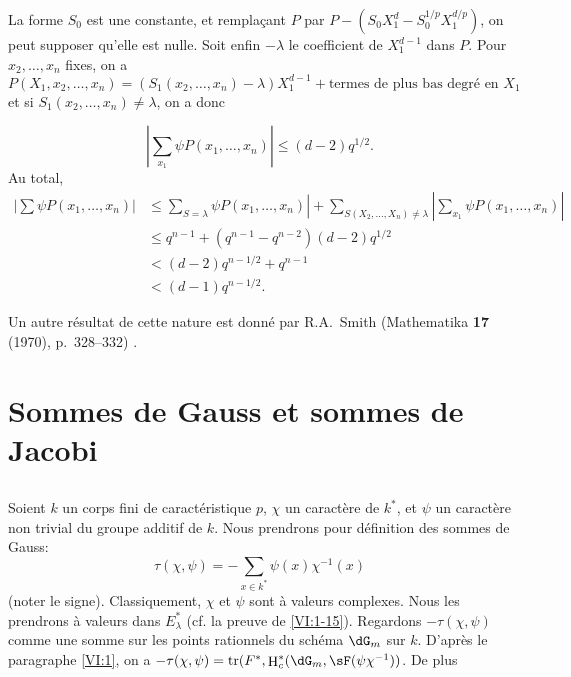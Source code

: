 \documentclass[oneside]{book}
\DeclareMathOperator{\h}{H}
\DeclareMathOperator{\tr}{tr}
\theoremstyle{sga-source}
\theoremstyle{sga-source-dash}
\theoremstyle{sga-source-dotdash}
\theoremstyle{sga-source-number-note-dash}
\theoremstyle{sga-source-note-number-dotdash}
\theoremstyle{sga-source-example-dotdash}
\theoremstyle{sga-source-inline-number}
\theoremstyle{sga-source-bare-number}
\theoremstyle{sga-source}
\newcommand{\PrintPage}[1]{}\newcommand{\MathPage}[1]{}\newcommand{\PrintCite}[2]{#1}\newcommand{\var}[3]{#1}
\begin{document}
La forme $S_0$ est une constante, et remplaçant $P$ par 
$P-(S_0 X_1^d -S_0^{1/p} X_1^{d/p})$, on peut supposer qu'elle est nulle. Soit 
enfin $-\lambda$ le coefficient de $X_1^{d-1}$ dans $P$. Pour $x_2,\dots,x_n$ 
fixes, on a 
\[
  P(X_1,x_2,\dots,x_n) = (S_1(x_2,\dots,x_n)-\lambda) X_1^{d-1} + \text{termes de plus bas degré en $X_1$} 
\]
et si $S_1(x_2,\dots,x_n)\ne \lambda$, on a donc 
\PrintPage{195}
\[
  \left| \sum_{x_1} \psi P(x_1,\dots,x_n)\right| \leqslant (d-2) q^{1/2} \text{.} 
\]
Au total, 
\begin{align*}
  \left|\sum \psi P(x_1,\dots,x_n)\right| 
    &\leqslant \var{\left.}{\left|}{S45-SOL-0794}\var{\sum_{S=\lambda}}{\sum_{S_1=\lambda}}{S45-SOL-0795} \psi P(x_1,\dots,x_n)\right| + \var{\sum_{S(X_2,\dots,X_n)\ne\lambda}}{\sum_{S_1(X_2,\dots,X_n)\ne\lambda}}{S45-SOL-0796} \left| \sum_{x_1} \psi P(x_1,\dots,x_n)\right| \\
    &\leqslant q^{n-1} + (q^{n-1}-q^{n-2})(d-2) q^{1/2} \\
    &\var{< (d-2) q^{n-1/2} + q^{n-1}}{\leqslant (d-2) q^{n-1/2} + q^{n-1}}{S45-SOL-0797} \\
    &< (d-1) q^{n-1/2} \text{.}
\end{align*}

Un autre résultat de cette nature est donné par R.A.\ Smith 
(Mathematika \textbf{17} (1970), p.~328--332) \cite{sm70}. 










\PrintPage{196}
\section{Sommes de Gauss et sommes de Jacobi}\label{VI:4}





\subsection{}\label{VI:4-1}

Soient $k$ un corps fini de caractéristique $p$, $\chi$ un caractère de 
$k^\ast$, et $\psi$ un caractère non trivial du groupe additif de $k$. Nous 
prendrons pour définition des sommes de Gauss: 
\begin{equation*}\tag{4.1.1}\label{VI:eq:4-1-1}
  \tau(\chi,\psi) = -\sum_{x\in k^\ast} \psi(x) \chi^{-1}(x) 
\end{equation*}
(noter le signe). Classiquement, $\chi$ et $\psi$ sont à valeurs complexes. 
Nous les prendrons à valeurs dans $E_\lambda^\ast$ (cf. la preuve de 
\ref{VI:1-15}). Regardons $-\tau(\chi,\psi)$ comme une somme sur les points 
rationnels du schéma $\dG_m$ sur $k$. D'après le paragraphe \ref{VI:1}, 
on a $-\tau(\chi,\psi) = \var{\tr(F^\ast,\h_c^\ast(\dG_m,\sF(\psi \chi^{-1}))}{\tr(F^\ast,\h_c^\ast(\dG_m,\sF(\psi \chi^{-1})))}{S45-SOL-0799}$. De 
plus 
\end{document}
